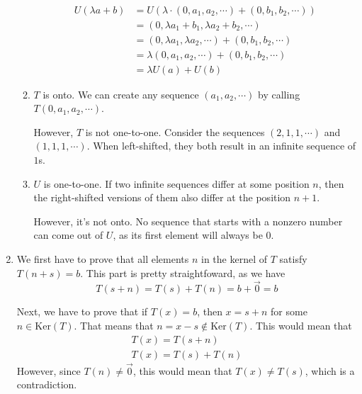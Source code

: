 \documentclass[12pt]{article}
\begin{document}
\begin{enumerate}
\begin{enumerate}
\begin{align*}
                        \end{align*}
                        \begin{align*}
                              U(\lambda a+b) & =U(\lambda \cdot (0, a_1, a_2, \cdots) + (0, b_1, b_2, \cdots)) \\
                                             & =(0, \lambda a_1+b_1, \lambda a_2+b_2, \cdots)                  \\
                                             & =(0, \lambda a_1, \lambda a_2, \cdots)+(0, b_1, b_2, \cdots)    \\
                                             & =\lambda (0, a_1, a_2, \cdots)+(0, b_1, b_2, \cdots)            \\
                                             & =\lambda U(a)+U(b)
                        \end{align*}
                  \item $T$ is onto.
                        We can create any sequence $(a_1, a_2, \cdots)$ by calling $T(0, a_1, a_2, \cdots)$.

                        However, $T$ is not one-to-one.
                        Consider the sequences $(2,1,1, \cdots)$ and \\ $(1,1,1, \cdots)$.
                        When left-shifted, they both result in an infinite sequence of $1$s.

                  \item $U$ is one-to-one.
                        If two infinite sequences differ at some position $n$, then the right-shifted versions
                        of them also differ at the position $n+1$.

                        However, it's not onto.
                        No sequence that starts with a nonzero number can come out of $U$,
                        as its first element will always be $0$.
            \end{enumerate}
      \item We first have to prove that all elements $n$ in the kernel of $T$ satisfy $T(n+s)=b$.
            This part is pretty straightfoward, as we have
            \[T(s+n)=T(s)+T(n)=b+\vec{0}=b\]

            Next, we have to prove that if $T(x)=b$, then $x=s+n$ for some $n \in \text{Ker}(T)$.
            That means that $n=x-s \notin \text{Ker}(T)$.
            This would mean that
            \begin{gather*}
                  T(x)=T(s+n) \\
                  T(x)=T(s)+T(n)
            \end{gather*}
            However, since $T(n) \ne \vec{0}$, this would mean that $T(x) \ne T(s)$, which is a contradiction.


\end{enumerate}
\end{document}
